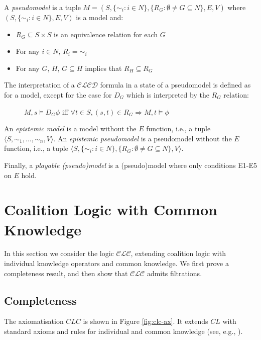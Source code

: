 \documentclass{article}
\newcommand{\acro}[1]{\ensuremath{\mathcal{#1}}}
\newcommand{\agents}{N}
\newcommand{\tuple}[1]{\langle #1\rangle}
\begin{document}
A \emph{pseudomodel} is a tuple $M=(S, \{\sim_i: i \in N\}, \{R_G :
\emptyset \neq G \subseteq \agents\}, E,V)$ where $(S, \{\sim_i: i \in
N\}, E,V)$ is a model and:
\begin{itemize}
\item $R_G \subseteq S \times S$ is an equivalence relation for each $G$
\item For any $i \in \agents$, $R_i = \sim_i$
\item For any $G$, $H$, $G \subseteq H$ implies that $R_H \subseteq R_G$
\end{itemize}
The interpretation of a \acro{CLCD} formula in a state of a
pseudomodel is defined as for a model, except for the case for $D_G$
which is interpreted by the $R_G$ relation:
\begin{description}
\item[] $M,s \models D_G \phi$ iff $\forall t \in S, (s,t) \in R_G \Rightarrow M,t \models \phi$
\end{description}

An \emph{epistemic model} is a model without the $E$ function, i.e., a
tuple $\tuple{S,\sim_1,\ldots,\sim_n,V}$. An \emph{epistemic
  pseudomodel} is a pseudomodel without the $E$ function, i.e., a
tuple $\tuple{S, \{\sim_i: i \in N\}, \{R_G : \emptyset \neq G
  \subseteq \agents\}, V}$.

Finally, a \emph{playable (pseudo)model} is a (pseudo)model where only 
conditions E1-E5 on $E$ hold.


\section{Coalition Logic with Common Knowledge}
\label{sec:clc}

In this section we consider the logic \acro{CLC}, extending coalition
logic with individual knowledge operators and common knowledge. We
first prove a completeness result, and then show that \acro{CLC}
admits filtrations.

\subsection{Completeness}

The axiomatisation $CLC$ is shown in Figure \ref{fig:clc-ax}. It extends
$CL$ with standard axioms and rules for individual and common knowledge
(see, e.g., \cite{Fagin1995}).
\end{document}
